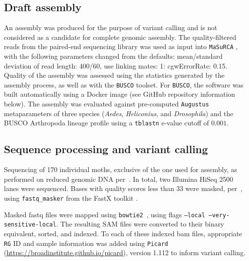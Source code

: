 \documentclass[smallextended]{svjour3}
\begin{document}
\subsection*{Draft assembly}

An assembly was produced for the purpose of variant calling and is not
considered as a candidate for complete genomic assembly. The quality-filtered
reads from the paired-end sequencing library was used as input into
\texttt{MaSuRCA} \citep[][version 2.3.2]{Zimin:2013kn}, with the following
parameters changed from the defaults: mean/standard deviation of read length:
400/60, use linking mates: 1: cgwErrorRate: 0.15.  Quality of the assembly was
assessed using the statistics generated by the assembly process, as well as with
the \texttt{BUSCO} \citep[][version 1.1b1]{Simao:2015kk} toolset. For
\texttt{BUSCO}, the software was built automatically using a Docker image (see
GitHub repository information below). The assembly was evaluated against
pre-computed \texttt{Augustus} \citep{Stanke:2003eo} metaparameters of  three
species (\textit{Aedes}, \textit{Heliconius}, and \textit{Drosophila}) and the
BUSCO Arthropoda lineage profile using a \texttt{tblastn} e-value cutoff of
$0.001$.

\subsection*{Sequence processing and variant calling} Sequencing of 170
individual moths, exclusive of the one used for assembly,  as performed on
reduced genomic DNA per~\cite{PARCHMAN:2012ca}. In total, two  Illumina HiSeq
2500 lanes were sequenced. Bases with quality scores less than 33 were masked,
per~\cite{Yun:2014dn},  using \texttt{fastq\_masker} from the FastX toolkit
\citep[][version 0.0.14]{citeulike:9103573}.

Masked fastq files were mapped using \texttt{bowtie2}~\citep[][version
2.2.4]{Langmead:2012jh}, using flags  \texttt{--local --very-sensitive-local}.
The resulting  SAM files were converted to their binary equivalent, sorted,
and indexed. To each of these indexed bam files, appropriate \texttt{RG} ID and
sample information was added using \texttt{Picard} \\
(\url{https://broadinstitute.github.io/picard}), version 1.112 to inform variant
calling.
\end{document}
